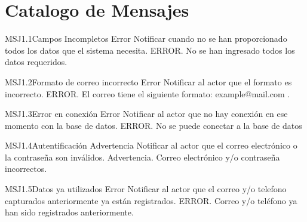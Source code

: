 \section{Catalogo de Mensajes}
	
	\begin{Message}{MSJ1.1}{Campos Incompletos}
		\MSGitem[Tipo:] Error	
		\MSGitem[Objetivo: ] Notificar cuando no se han proporcionado todos los datos que el sistema necesita.
		\MSGitem[Redacción: ] ERROR. No se han ingresado todos los datos requeridos.
	\end{Message}
	
	\begin{Message}{MSJ1.2}{Formato de correo incorrecto}
		\MSGitem[Tipo:] Error	
		\MSGitem[Objetivo: ] Notificar al actor que el formato es incorrecto.
		\MSGitem[Redacción: ] ERROR. El correo tiene el siguiente formato: example@mail.com .
	\end{Message}

	\begin{Message}{MSJ1.3}{Error en conexión}
		\MSGitem[Tipo:] Error	
		\MSGitem[Objetivo: ] Notificar al actor que no hay conexión en ese momento con la base de datos.
		\MSGitem[Redacción: ] ERROR. No se puede conectar a la base de datos
	\end{Message}
	
	\begin{Message}{MSJ1.4}{Autentificación}
		\MSGitem[Tipo:] Advertencia	
		\MSGitem[Objetivo: ] Notificar al actor que el correo electrónico o la contraseña son inválidos.
		\MSGitem[Redacción: ] Advertencia. Correo electrónico y/o contraseña incorrectos.
	\end{Message}
	
	\begin{Message}{MSJ1.5}{Datos ya utilizados}
		\MSGitem[Tipo:] Error
		\MSGitem[Objetivo: ] Notificar al actor que el correo y/o telefono capturados anteriormente ya están registrados.
		\MSGitem[Redacción: ] ERROR. Correo y/o teléfono ya han sido registrados anteriormente.
	\end{Message}